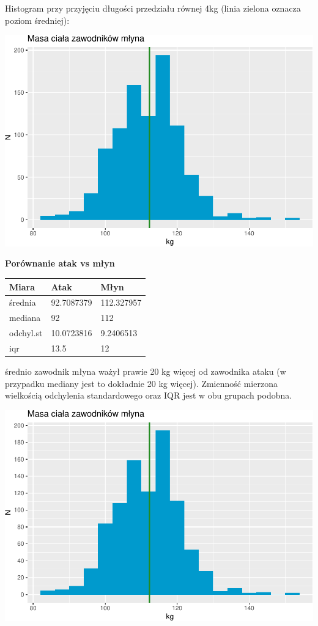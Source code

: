 \documentclass[
  openany]{book}
\begin{document}
\begin{example}
Histogram przy przyjęciu długości przedziału równej 4kg
(linia zielona oznacza poziom średniej):

\includegraphics{_main_files/figure-latex/unnamed-chunk-16-1.pdf}

\textbf{Porównanie atak vs młyn}

\begin{longtable}[]{@{}lll@{}}
\toprule\noalign{}
Miara & Atak & Młyn \\
\midrule\noalign{}
\endhead
\bottomrule\noalign{}
\endlastfoot
średnia & 92.7087379 & 112.327957 \\
mediana & 92 & 112 \\
odchyl.st & 10.0723816 & 9.2406513 \\
iqr & 13.5 & 12 \\
\end{longtable}

średnio zawodnik młyna ważył prawie 20 kg więcej od zawodnika ataku (w przypadku mediany
jest to dokładnie 20 kg więcej).
Zmienność mierzona wielkością odchylenia standardowego oraz IQR jest w obu grupach podobna.

\includegraphics{_main_files/figure-latex/unnamed-chunk-17-1.pdf}
\end{example}
\end{document}
